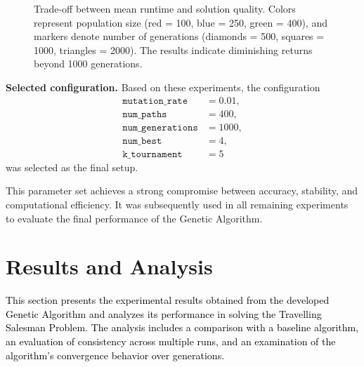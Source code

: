 \documentclass{scrartcl}
\begin{document}
\begin{figure}[H]

  \caption{Trade-off between mean runtime and solution quality.  
  Colors represent population size (red = 100, blue = 250, green = 400), and markers denote number of generations (diamonds = 500, squares = 1000, triangles = 2000).  
  The results indicate diminishing returns beyond 1000 generations.}
  \label{fig:runtime_tradeoff}
\end{figure}


\vspace{0.3cm}
\noindent\textbf{Selected configuration.}  
Based on these experiments, the configuration
\[
\begin{aligned}
\texttt{mutation\_rate} &= 0.01, \\
\texttt{num\_paths} &= 400, \\
\texttt{num\_generations} &= 1000, \\
\texttt{num\_best} &= 4, \\
\texttt{k\_tournament} &= 5
\end{aligned}
\]
was selected as the final setup.

This parameter set achieves a strong compromise between accuracy, stability, and computational efficiency.  
It was subsequently used in all remaining experiments to evaluate the final performance of the Genetic Algorithm.



\section{Results and Analysis}
\label{sec:results-analysis}



\textcolor{black}{
This section presents the experimental results obtained from the developed Genetic Algorithm and analyzes its performance in solving the Travelling Salesman Problem. 
The analysis includes a comparison with a baseline algorithm, an evaluation of consistency across multiple runs, and an examination of the algorithm’s convergence behavior over generations.
}
\end{document}
